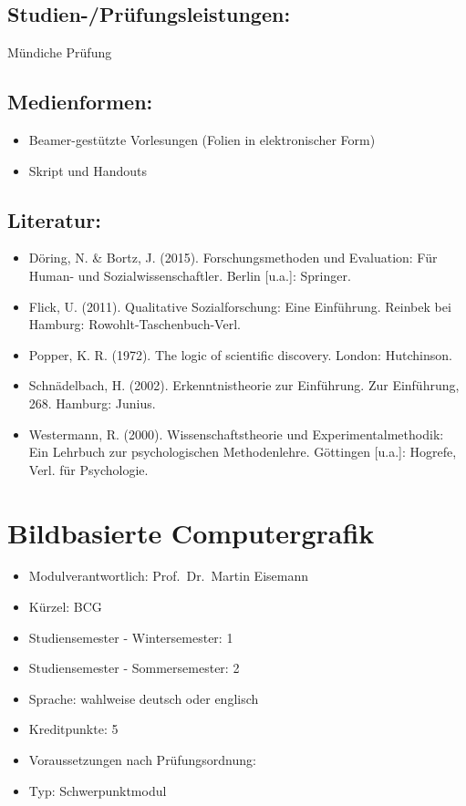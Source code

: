 \section*{Studien-/Prüfungsleistungen:}\label{studien-pruxfcfungsleistungen-14}

Mündiche Prüfung

\section*{Medienformen:}\label{medienformen-14}

\begin{itemize}
\item
  Beamer-gestützte Vorlesungen (Folien in elektronischer Form)
\item
  Skript und Handouts
\end{itemize}

\section*{Literatur:}\label{literatur-11}

\begin{itemize}
\item
  Döring, N. \& Bortz, J. (2015). Forschungsmethoden und Evaluation: Für
  Human- und Sozialwissenschaftler. Berlin {[}u.a.{]}: Springer.
\item
  Flick, U. (2011). Qualitative Sozialforschung: Eine Einführung.
  Reinbek bei Hamburg: Rowohlt-Taschenbuch-Verl.
\item
  Popper, K. R. (1972). The logic of scientific discovery. London:
  Hutchinson.
\item
  Schnädelbach, H. (2002). Erkenntnistheorie zur Einführung. Zur
  Einführung, 268. Hamburg: Junius.
\item
  Westermann, R. (2000). Wissenschaftstheorie und Experimentalmethodik:
  Ein Lehrbuch zur psychologischen Methodenlehre. Göttingen {[}u.a.{]}:
  Hogrefe, Verl. für Psychologie.
\end{itemize}

\chapter{Bildbasierte Computergrafik}\label{bildbasierte-computergrafik}

\begin{itemize}
\tightlist
\item
  Modulverantwortlich: Prof.~Dr.~Martin Eisemann
\item
  Kürzel: BCG
\item
  Studiensemester - Wintersemester: 1
\item
  Studiensemester - Sommersemester: 2
\item
  Sprache: wahlweise deutsch oder englisch
\item
  Kreditpunkte: 5
\item
  Voraussetzungen nach Prüfungsordnung: ~
\item
  Typ: Schwerpunktmodul
\end{itemize}

